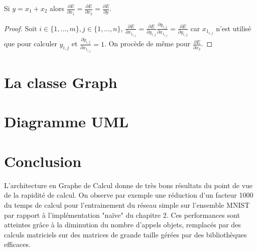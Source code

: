 \begin{proposition}
Si $y = x_1 + x_2$ alors $\frac{\partial E}{\partial x_1} = \frac{\partial E}{\partial x_2} = \frac{\partial E}{\partial y}$.
\end{proposition}

\begin{proof}
Soit $i \in \{1, ..., m\}, j \in \{1, ..., n\}$, $\frac{\partial E}{\partial x_{1_{i, j}}} = \frac{\partial E}{\partial y_{i, j}}\frac{\partial y_{i, j}}{\partial x_{1_{i, j}}} = \frac{\partial E}{\partial y_{i, j}}$ car $x_{1_{i, j}}$ n'est utilisé que pour calculer $y_{i, j}$ et $\frac{\partial y_{i, j}}{\partial x_{1_{i, j}}} = 1$. On procède de même pour $\frac{\partial E}{\partial x_2}$.
\end{proof}

\section{La classe Graph}


\section{Diagramme UML}


\section{Conclusion}

L'architecture en Graphe de Calcul donne de très bons résultats du point de vue de la rapidité de calcul. On observe par exemple une réduction d'un facteur 1000 du temps de calcul pour l'entrainement du réseau simple sur l'ensemble MNIST par rapport à l'implémentation "naïve" du chapitre 2. Ces performances sont atteintes grâce à la diminution du nombre d'appels objets, remplacés par des calculs matriciels sur des matrices de grande taille gérées par des bibliothèques efficaces.